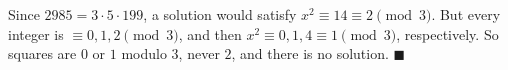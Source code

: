 Since $2985=3\cdot5\cdot199$, a solution would satisfy $x^2\equiv14\equiv2\pmod3$. But every integer is $\equiv0,1,2\pmod3$, and then $x^2\equiv0,1,4\equiv1\pmod3$, respectively. So squares are $0$ or $1$ modulo $3$, never $2$, and there is no solution. $\blacksquare$
